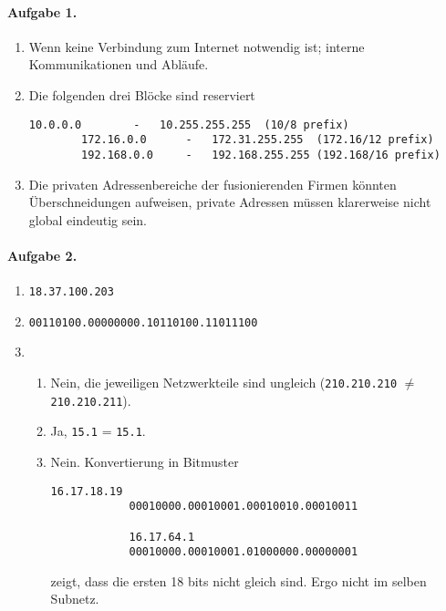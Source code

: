 \documentclass{article}
\begin{document}
\paragraph{Aufgabe 1.}

\begin{enumerate}
    \item Wenn keine Verbindung zum Internet notwendig ist; interne Kommunikationen und Abläufe.

    \item Die folgenden drei Blöcke sind reserviert
    \begin{lstlisting}[gobble=8]
        10.0.0.0        -   10.255.255.255  (10/8 prefix)
        172.16.0.0      -   172.31.255.255  (172.16/12 prefix)
        192.168.0.0     -   192.168.255.255 (192.168/16 prefix)
    \end{lstlisting}

    \item Die privaten Adressenbereiche der fusionierenden Firmen könnten Überschneidungen aufweisen, private Adressen müssen klarerweise nicht global eindeutig sein. 
\end{enumerate}

\paragraph{Aufgabe 2.} 

\begin{enumerate}
    \item \lstinline{18.37.100.203}

    \item \lstinline{00110100.00000000.10110100.11011100}

    \item \begin{enumerate}
        \item Nein, die jeweiligen Netzwerkteile sind ungleich (\lstinline{210.210.210} $\neq$ \lstinline{210.210.211}).
        \item Ja, \lstinline{15.1} = \lstinline{15.1}.
        \item Nein. Konvertierung in Bitmuster
        \begin{lstlisting}[gobble=12]
            16.17.18.19
            00010000.00010001.00010010.00010011

            16.17.64.1
            00010000.00010001.01000000.00000001
        \end{lstlisting}
        zeigt, dass die ersten 18 bits nicht gleich sind. Ergo nicht im selben Subnetz.
    \end{enumerate}
\end{enumerate}
\end{document}
